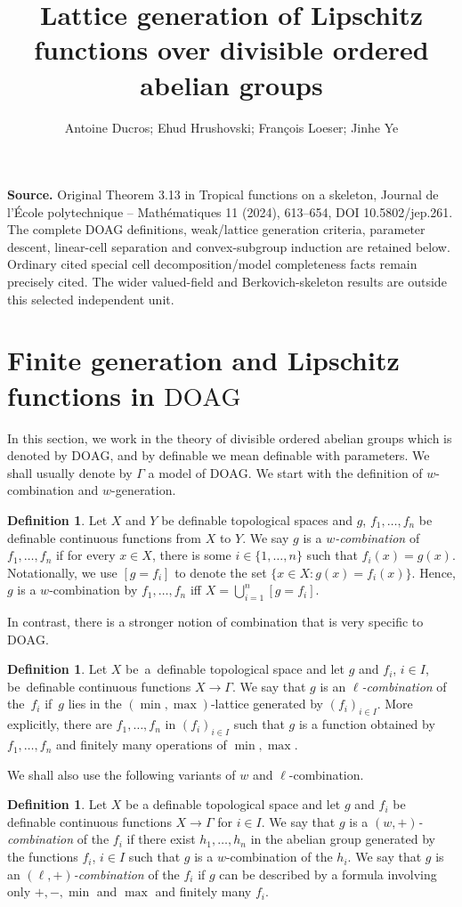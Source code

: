\documentclass[10pt]{amsart}
\title{Lattice generation of Lipschitz functions over divisible ordered abelian groups}
\author{Antoine Ducros; Ehud Hrushovski; Fran\c{c}ois Loeser; Jinhe Ye}
\date{}
\theoremstyle{definition}
\newtheorem{defi}[subsection]{Definition}
\theoremstyle{remark}
\newcommand{\DOAG}{\mathrm{DOAG}}
\theoremstyle{plain}
\theoremstyle{definition}
\begin{document}
\maketitle
\noindent\textbf{Source.} Original Theorem 3.13 in Tropical functions on a skeleton, Journal de l'\'Ecole polytechnique -- Math\'ematiques 11 (2024), 613--654, DOI 10.5802/jep.261. The complete DOAG definitions, weak/lattice generation criteria, parameter descent, linear-cell separation and convex-subgroup induction are retained below. Ordinary cited special cell decomposition/model completeness facts remain precisely cited. The wider valued-field and Berkovich-skeleton results are outside this selected independent unit.
\setcounter{section}{2}
\section{Finite generation and Lipschitz functions in \texorpdfstring{$\DOAG$}{DOAG}}\label{section4}
In this section, we work in the theory of divisible ordered abelian groups which is denoted by $\DOAG$, and by definable we mean definable with parameters. We shall usually denote by
$\Gamma$ a model of $\DOAG$. We start with the definition of $w$-combination and $w$-generation.
\begin{defi}\label{def:t-gen}Let $X$ and $Y$ be definable topological spaces and $g$, $f_1,\ldots,f_n$ be definable continuous functions from $X$ to $Y$. We say $g$ is a \emph{$w$-combination} of $f_1,\ldots,f_n$ if for every $x\in X$, there is some $i\in \{1, \ldots, n\}$ such that $f_i(x)=g(x)$. Notationally, we use $[g=f_i]$ to denote the set $\{x\in X:g(x)=f_i(x)\}$. Hence, $g$ is a $w$-combination by $f_1,\ldots,f_n$ iff $X=\bigcup^n_{i=1}[g=f_i]$.
\end{defi}

In contrast, there is a stronger notion of combination that is very specific to $\DOAG$.
\begin{defi}\label{def:l-gen}Let $X$ be~a~definable topological space and let $g$ and $f_i$, $i\in I$, be~definable continuous functions $X\to \Gamma$. We say that $g$ is an \emph{$\ell$-combination} of the~$f_i$ if~$g$ lies in the $(\min,\max)$-lattice generated by $(f_i)_{i\in I}$. More explicitly, there are $f_1,\ldots,f_n$ in $(f_i)_{i\in I}$ such that $g$ is a function obtained by $f_1,\ldots,f_n$ and finitely many operations of $\min,\max$.
\end{defi}

We shall also use the following variants of $w$ and $\ell$-combination.
\begin{defi}\label{def:l-genvar}Let $X$ be a definable topological space and let $g$ and $f_i$
be definable continuous functions $X\to \Gamma$ for $i\in I$.
We say that $g$ is a \emph{$(w, +)$-combination} of the $f_i$ if there exist $h_1, \ldots, h_n$ in the abelian group generated by the functions $f_i$, $i \in I$ such that $g$ is a $w$-combination of the $h_i$.
We say that $g$ is an \emph{$(\ell, +)$-combination} of the $f_i$ if $g$ can be described by a formula involving only $+,-,\min$ and $\max$ and finitely many $f_i$.
\end{defi}
\end{document}
